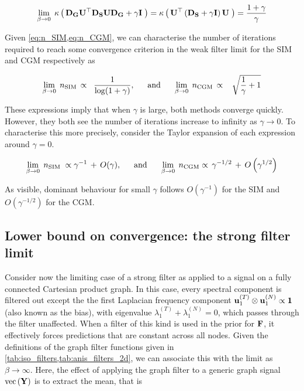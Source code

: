 \begin{equation}
    \lim_{\beta \rightarrow 0} \; \kappa \left(  \, \mathbf{D}_{\mathbf{G}} \mathbf{U}^\top \mathbf{D}_{\mathbf{S}} \mathbf{U} \mathbf{D}_{\mathbf{G}} + \gamma \mathbf{I} \; \right)
    = \kappa  \left(  \, \mathbf{U}^\top \left( \mathbf{D}_{\mathbf{S}} + \gamma \mathbf{I} \right) \mathbf{U} \; \right)
    = \frac{1 + \gamma}{\gamma}
\end{equation}

 Given \cref{eq:n_SIM,eq:n_CGM}, we can characterise the number of iterations required to reach some convergence criterion in the weak filter limit for the SIM and CGM respectively as

 \begin{equation}
    \label{eq:n_WFL}
    \lim_{\beta \rightarrow 0} \;  n_\text{SIM} \, \propto \;\;  \frac{1}{\log(1 + \gamma)}, \;\;  \quad \text{and} \quad  \;\; \lim_{\beta \rightarrow 0} \;  n_\text{CGM} \, \propto \;\;\;  \sqrt{\frac{1}{\gamma} + 1}
 \end{equation}

These expressions imply that when $\gamma$ is large, both methods converge quickly. However, they both see the number of iterations increase to infinity as $\gamma \rightarrow 0$. To characterise this more precisely, consider the Taylor expansion of each expression around $\gamma = 0$.  

\begin{equation}
    \lim_{\beta \rightarrow 0} \;  n_\text{SIM}  \;  \propto \gamma^{-1} \, + \, O(\gamma), \;\; \quad \text{and} \quad \;\; \lim_{\beta \rightarrow 0} \;  n_\text{CGM} \propto \, \gamma^{-1/2} \, + \, O\left(\gamma^{1/2}\right) 
\end{equation}


As visible, dominant behaviour for small $\gamma$ follows $O(\gamma^{-1})$ for the SIM and $O(\gamma^{-1/2})$ for the CGM.

\subsection{Lower bound on convergence: the strong filter limit}

Consider now the limiting case of a strong filter as applied to a signal on a fully connected Cartesian product graph. In this case, every spectral component is filtered out except the the first Laplacian frequency component $\mathbf{u}_1^{(T)} \otimes \mathbf{u}_1^{(N)}   \propto \mathbf{1}$ (also known as the bias), with eigenvalue $\lambda_1^{(T)} + \lambda_1^{(N)} = 0$, which passes through the filter unaffected. When a filter of this kind is used in the prior for $\mathbf{F}$, it effectively forces predictions that are constant across all nodes. Given the definitions of the graph filter functions given in \cref{tab:iso_filters,tab:anis_filters_2d}, we can associate this with the limit as $\beta \rightarrow \infty$. Here, the effect of applying the graph filter to a generic graph signal $\text{\textup{vec}}\left(\mathbf{Y}\right)$ is to extract the mean, that is 

